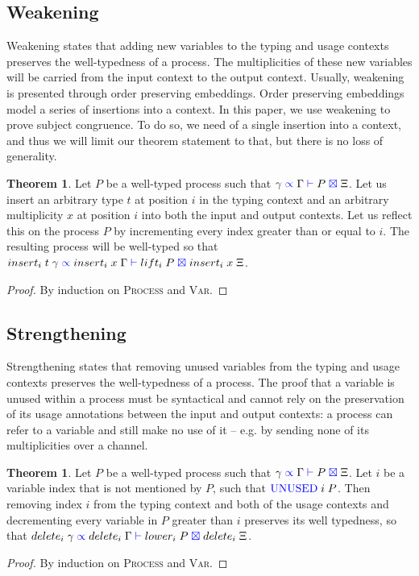 \documentclass[a4paper,UKenglish,cleveref, autoref, thm-restate,authorcolumns]{lipics-v2019}
\theoremstyle{definition}
\newtheorem{nitheorem}[theorem]{Theorem}
\newcommand{\type}[1]{\textcolor{blue}{\operatorname{#1}}}
\newcommand{\types}[4]{#1 \; \type{\propto} \; #2 \; \type{\vdash} \; #3 \; \type{\boxtimes} \; #4}
\newcommand{\Unused}{\type{UNUSED}}
\begin{document}
\subsection{Weakening}

Weakening states that adding new variables to the typing and usage contexts preserves the well-typedness of a process.
The multiplicities of these new variables will be carried from the input context to the output context.
Usually, weakening is presented through order preserving embeddings.
Order preserving embeddings model a series of insertions into a context.
In this paper, we use weakening to prove subject congruence.
To do so, we need of a single insertion into a context, and thus we will limit our theorem statement to that, but there is no loss of generality.

\begin{nitheorem}
  \label{thm:weakening}
  Let $P$ be a well-typed process such that $\types{\gamma}{\Gamma}{P}{\Xi}$.
  Let us insert an arbitrary type $t$ at position $i$ in the typing context and an arbitrary multiplicity $x$ at position $i$ into both the input and output contexts.
  Let us reflect this on the process $P$ by incrementing every index greater than or equal to $i$.
  The resulting process will be well-typed so that $\types{insert_i \; t \; \gamma}{insert_i \; x \; \Gamma}{lift_i \; P}{insert_i \; x \; \Xi}$.
\end{nitheorem}
\begin{proof}
  By induction on \textsc{Process} and \textsc{Var}.
\end{proof}

\subsection{Strengthening}

Strengthening states that removing unused variables from the typing and usage contexts preserves the well-typedness of a process.
The proof that a variable is unused within a process must be syntactical and cannot rely on the preservation of its usage annotations between the input and output contexts: a process can refer to a variable and still make no use of it -- e.g. by sending none of its multiplicities over a channel.

\begin{nitheorem}
  \label{thm:strengthening}
  Let $P$ be a well-typed process such that $\types{\gamma}{\Gamma}{P}{\Xi}$.
  Let $i$ be a variable index that is not mentioned by $P$, such that $\Unused \; i \; P$.
  Then removing index $i$ from the typing context and both of the usage contexts and decrementing every variable in $P$ greater than $i$ preserves its well typedness, so that $\types{delete_i \; \gamma}{delete_i \; \Gamma}{lower_i \; P}{delete_i \; \Xi}$.
\end{nitheorem}
\begin{proof}
  By induction on \textsc{Process} and \textsc{Var}.
\end{proof}
\end{document}
